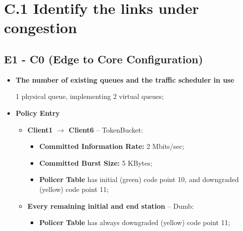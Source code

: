 \documentclass[conference,compsoc]{IEEEtran}
\begin{document}
    
    
    \section{C.1 Identify the links under congestion}
    
    \subsection{E1 - C0 (Edge to Core Configuration)}
    \begin{itemize}
        \item \textbf{The number of existing queues and the traffic scheduler in use} \par 
        1 physical queue,  implementing 2 virtual queues;  
        \vspace{5mm}
        \item \textbf{Policy Entry}
        \begin{itemize}
            \item \textbf{Client1 $\rightarrow$ Client6} -- TokenBucket:
            \begin{itemize}
                \item \textbf{Committed Information Rate:} 2 Mbits/sec;
                \item \textbf{Committed Burst Size:} 5 KBytes;
                \item \textbf{Policer Table} has initial (green) code point 10, and downgraded (yellow) code point 11;
            \end{itemize}
            \item \textbf{Every remaining initial and end station} -- Dumb:
             \begin{itemize}
                \item \textbf{Policer Table} has always downgraded (yellow) code point 11;
            \end{itemize}
        \end{itemize}
        

\end{itemize}
\end{document}
